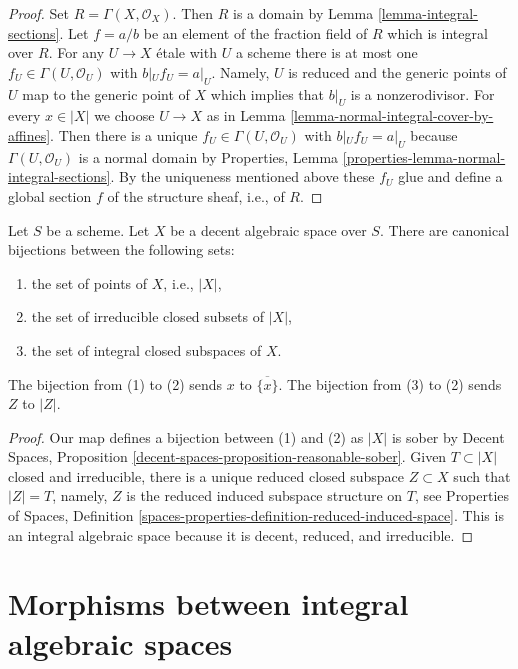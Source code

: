 \begin{proof}
Set $R = \Gamma(X, \mathcal{O}_X)$. Then $R$ is a domain by
Lemma \ref{lemma-integral-sections}.
Let $f = a/b$ be an element of the fraction field of $R$
which is integral over $R$.
For any $U \to X$ \'etale with $U$ a scheme there is at most one
$f_U \in \Gamma(U, \mathcal{O}_U)$ with $b|_U f_U = a|_U$.
Namely, $U$ is reduced and the generic points of $U$ map to
the generic point of $X$ which implies that $b|_U$ is a
nonzerodivisor.
For every $x \in |X|$ we choose $U \to X$ as in
Lemma \ref{lemma-normal-integral-cover-by-affines}.
Then there is a unique $f_U \in \Gamma(U, \mathcal{O}_U)$
with $b|_U f_U = a|_U$ because
$\Gamma(U, \mathcal{O}_U)$ is a normal domain by
Properties, Lemma \ref{properties-lemma-normal-integral-sections}.
By the uniqueness mentioned above these $f_U$
glue and define a global section $f$ of the structure
sheaf, i.e., of $R$.
\end{proof}

\begin{lemma}
\label{lemma-decent-irreducible-closed}
Let $S$ be a scheme. Let $X$ be a decent algebraic space over $S$.
There are canonical bijections between the following sets:
\begin{enumerate}
\item the set of points of $X$, i.e., $|X|$,
\item the set of irreducible closed subsets of $|X|$,
\item the set of integral closed subspaces of $X$.
\end{enumerate}
The bijection from (1) to (2) sends $x$ to $\overline{\{x\}}$.
The bijection from (3) to (2) sends $Z$ to $|Z|$.
\end{lemma}

\begin{proof}
Our map defines a bijection between (1) and (2) as $|X|$ is
sober by 
Decent Spaces, Proposition \ref{decent-spaces-proposition-reasonable-sober}.
Given $T \subset |X|$ closed and irreducible, there is a
unique reduced closed subspace $Z \subset X$ such that
$|Z| = T$, namely, $Z$ is the reduced induced subspace structure
on $T$, see Properties of Spaces, Definition
\ref{spaces-properties-definition-reduced-induced-space}.
This is an integral algebraic space because it is decent,
reduced, and irreducible.
\end{proof}






\section{Morphisms between integral algebraic spaces}
\label{section-morphisms-between-integral-spaces}

